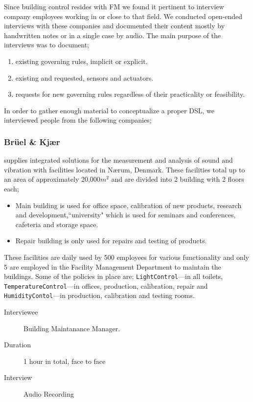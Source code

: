 Since building control resides with FM we found it pertinent to interview company employees working in or close to that field. We conducted open-ended interviews with these companies and documented their content mostly by handwritten notes or in a single case by audio. The main purpose of the interviews was to document;

\begin{enumerate}
	\item existing governing rules, implicit or explicit.
	\item existing and requested, sensors and actuators.
	\item requests for new governing rules regardless of their practicality or feasibility.
\end{enumerate}

In order to gather enough material to conceptualize a proper DSL, we interviewed people from the following companies;

\subsubsection{Br\"{u}el \& Kj\ae r} supplies integrated solutions for the measurement and analysis of sound and vibration with facilities located in N\ae rum, Denmark. These facilities total up to an area of approximately 20,000$m^2$ and are divided into 2 building with 2 floors each; 
\begin{itemize}
	\item Main building is used for office space, calibration of new products, research and development,``university" which is used for seminars and conferences, cafeteria and storage space.
	\item Repair building is only used for repairs and testing of products.
\end{itemize}	
These facilities are daily used by 500 employees for various functionality and only 5 are employed in the Facility Management Department to maintain the buildings. Some of the policies in place are; \texttt{LightControl}---in all toilets,  \texttt{TemperatureControl}---in offices, production, calibration, repair and \texttt{HumidityContol}---in production, calibration and testing rooms.
\begin{description}
	\item[Interviewee] Building Maintanance Manager.
	\item[Duration] 1 hour in total, face to face
	\item[Interview] Audio Recording
\end{description}

